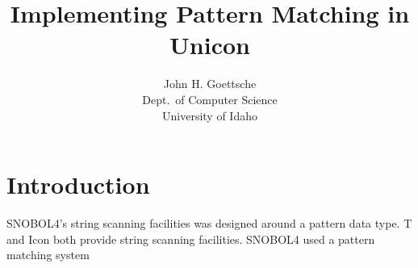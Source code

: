 \documentclass{article}
\begin{document}
\title{Implementing Pattern Matching in Unicon}
\author{John H. Goettsche\\
  Dept.\ of Computer Science\\
  University of Idaho}

\maketitle

\begin{abstract}


\end{abstract}

\section{Introduction}

SNOBOL4's string scanning facilities was designed around a pattern data type.  T and Icon both provide string scanning facilities.  SNOBOL4 used a pattern matching system
\end{document}
